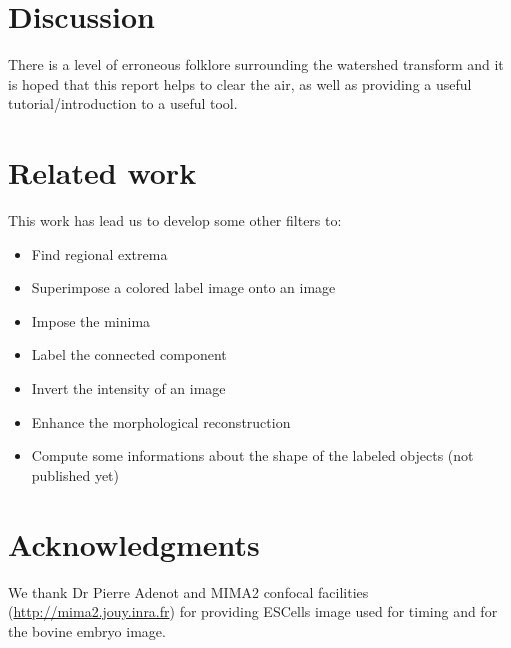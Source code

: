 \documentclass{InsightArticle}
\begin{document}
\section{Discussion}
There is a level of erroneous folklore surrounding the watershed
transform and it is hoped that this report helps to clear the air, as
well as providing a useful tutorial/introduction to a useful tool.

\section{Related work}
This work has lead us to develop some other filters to:
\begin{itemize}
  \item Find regional extrema \cite{regionalExtrema}
  \item Superimpose a colored label image onto an image \cite{labelOverlay}
  \item Impose the minima \cite{minimaImposition}
  \item Label the connected component \cite{connectedComponent}
  \item Invert the intensity of an image \cite{invert}
  \item Enhance the morphological reconstruction \cite{recons}
  \item Compute some informations about the shape of the labeled objects (not published yet)
\end{itemize}

\section{Acknowledgments}
We thank Dr Pierre Adenot and MIMA2 confocal facilities
(\url{http://mima2.jouy.inra.fr}) for providing ESCells image used for
timing and for the bovine embryo image.


\appendix





\nocite{ITKSoftwareGuide}
\end{document}
